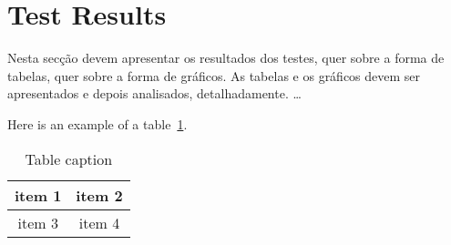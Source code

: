\section{Test Results}
Nesta secção devem apresentar os resultados dos testes, quer sobre a forma
de tabelas, quer sobre a forma de gráficos. As tabelas e os gráficos devem ser
apresentados e depois analisados, detalhadamente.
\ldots

Here is an example of a table~\ref{table:simple}.

\begin{table}[!htb]
  \begin{center}
  \caption[Table caption shown in TOC]{Table caption}
    \begin{tabular}{|c|c|}
      \hline
      item 1 & item 2 \\
      \hline
      item 3 & item 4 \\
      \hline
    \end{tabular}
  \end{center}
  \label{table:simple}
\end{table}
